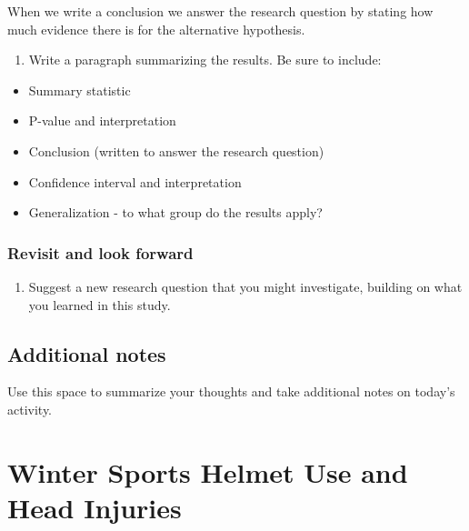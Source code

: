 \documentclass[
]{report}
\providecommand{\tightlist}{%
  \setlength{\itemsep}{0pt}\setlength{\parskip}{0pt}}
\begin{document}
When we write a conclusion we answer the research question by stating how much evidence there is for the alternative hypothesis.

\begin{enumerate}
\def\labelenumi{\arabic{enumi}.}
\setcounter{enumi}{28}
\tightlist
\item
  Write a paragraph summarizing the results. Be sure to include:
\end{enumerate}

\begin{itemize}
\item
  Summary statistic
\item
  P-value and interpretation
\item
  Conclusion (written to answer the research question)
\item
  Confidence interval and interpretation
\item
  Generalization - to what group do the results apply?
\end{itemize}

\vspace{3in}

\hypertarget{revisit-and-look-forward}{%
\subsection{Revisit and look forward}\label{revisit-and-look-forward}}

\begin{enumerate}
\def\labelenumi{\arabic{enumi}.}
\setcounter{enumi}{29}
\tightlist
\item
  Suggest a new research question that you might investigate, building on what you learned in this study.
\end{enumerate}

\vspace{1in}

\hypertarget{additional-notes}{%
\section{Additional notes}\label{additional-notes}}

Use this space to summarize your thoughts and take additional notes on today's activity.

\hypertarget{winter-sports-helmet-use-and-head-injuries}{%
\chapter{Winter Sports Helmet Use and Head Injuries}\label{winter-sports-helmet-use-and-head-injuries}}
\end{document}

